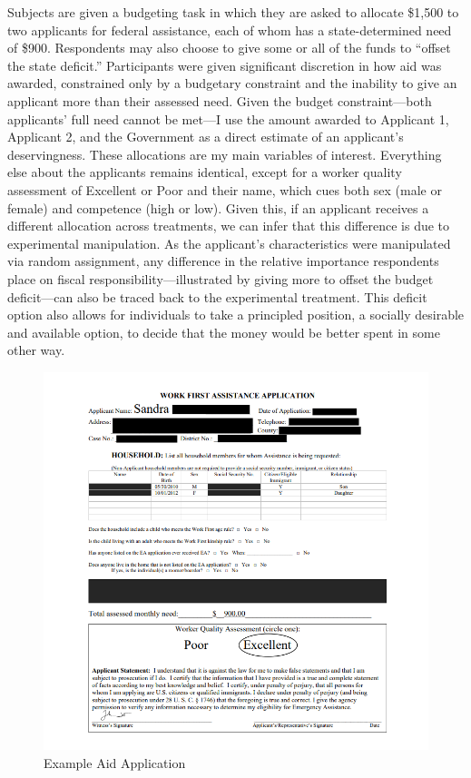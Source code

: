 \documentclass[12pt]{article}%
\begin{document}
\begin{doublespace}
Subjects are given a budgeting task in which they are asked to allocate \$1,500 to two applicants for federal assistance, each of whom has a state-determined need of \$900. Respondents may also choose to give some or all of the funds to ``offset the state deficit.”  Participants were given significant discretion in how aid was awarded, constrained only by a budgetary constraint and the inability to give an applicant more than their assessed need. Given the budget constraint—both applicants’ full need cannot be met—I use the amount awarded to Applicant 1, Applicant 2, and the Government as a direct estimate of an applicant’s deservingness. These allocations are my main variables of interest. Everything else about the applicants remains identical, except for a worker quality assessment of Excellent or Poor and their name, which cues both sex (male or female) and competence (high or low). Given this, if an applicant receives a different allocation across treatments, we can infer that this difference is due to experimental manipulation. As the applicant’s characteristics were manipulated via random assignment, any difference in the relative importance respondents place on fiscal responsibility—illustrated by giving more to offset the budget deficit—can also be traced back to the experimental treatment. This deficit option also allows for individuals to take a principled position, a socially desirable and available option, to decide that the money would be better spent in some other way.

\begin{figure}[h!]
	\centering
	\includegraphics[scale=1]{figs/example_treatment.png}
	\caption{Example Aid Application}
	\label{figure2}
\end{figure}



\end{doublespace}
\end{document}
